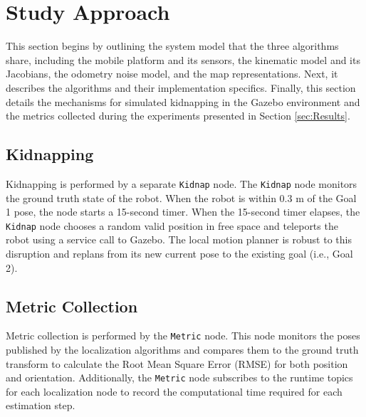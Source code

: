\section{Study Approach}\label{Study-Approach}
This section begins by outlining the system model that the three algorithms share, including the mobile platform and its sensors, the kinematic model and its Jacobians, the odometry noise model, and the map representations.
Next, it describes the algorithms and their implementation specifics.
Finally, this section details the mechanisms for simulated kidnapping in the Gazebo environment and the metrics collected during the experiments presented in Section \ref{sec:Results}.









\subsection{Kidnapping}
Kidnapping is performed by a separate \texttt{Kidnap} node.
The \texttt{Kidnap} node monitors the ground truth state of the robot.
When the robot is within $0.3$ m of the Goal 1 pose, the node starts a 15-second timer.
When the 15-second timer elapses, the \texttt{Kidnap} node chooses a random valid position in free space and teleports the robot using a service call to Gazebo.
The local motion planner is robust to this disruption and replans from its new current pose to the existing goal (i.e., Goal 2).

\subsection{Metric Collection}
Metric collection is performed by the \texttt{Metric} node.
This node monitors the poses published by the localization algorithms and compares them to the ground truth transform to calculate the Root Mean Square Error (RMSE) for both position and orientation.
Additionally, the \texttt{Metric} node subscribes to the runtime topics for each localization node to record the computational time required for each estimation step.